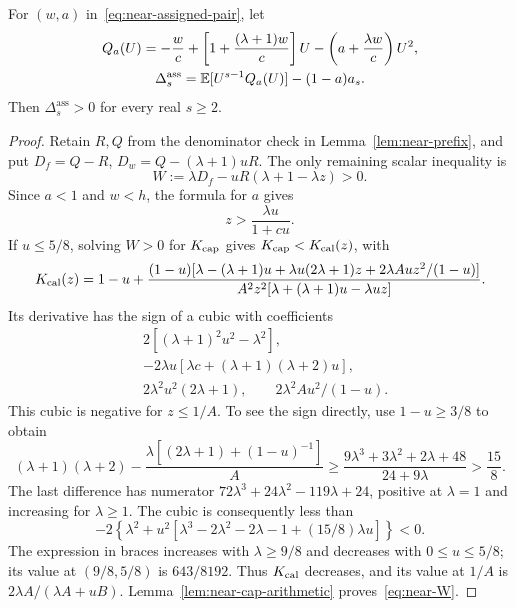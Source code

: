 \begin{lemma}\label{lem:near-condition-f}
For $(w,a)$ in~\eqref{eq:near-assigned-pair}, let
\[\begin{gathered}
 Q_a(U)=-\frac wc+\left[1+\frac{(\lambda+1)w}{c}\right]U
                  -\left(a+\frac{\lambda w}{c}\right)U^2,\\
 \Delta_s^{\mathrm{ass}}=\mathbb E[U^{s-1}Q_a(U)]-(1-a)a_s.
\end{gathered}\]
Then $\Delta_s^{\mathrm{ass}}>0$ for every real $s\ge2$.
\end{lemma}
\begin{proof}
Retain $R,Q$ from the denominator check in Lemma~\ref{lem:near-prefix}, and put $D_f=Q-R$, $D_w=Q-(\lambda+1)uR$. The only remaining scalar inequality is
\begin{equation}\label{eq:near-W}
 W:=\lambda D_f-uR(\lambda+1-\lambda z)>0.
\end{equation}
Since $a<1$ and $w<h$, the formula for $a$ gives
\[
 z>\frac{\lambda u}{1+cu}.
\]
If $u\le5/8$, solving $W>0$ for $K_{\rm cap}$ gives $K_{\rm cap}<K_{\rm cal}(z)$, with
\[
 K_{\rm cal}(z)=1-u+
 \frac{(1-u)[\lambda-(\lambda+1)u+\lambda u(2\lambda+1)z+
                       2\lambda Au z^2/(1-u)]}
      {A^2z^2[\lambda+(\lambda+1)u-\lambda uz]}.
\]
Its derivative has the sign of a cubic with coefficients
\[
\begin{split}
 &2[(\lambda+1)^2u^2-\lambda^2],\\
 &-2\lambda u[\lambda c+(\lambda+1)(\lambda+2)u],\\
 &2\lambda^2u^2(2\lambda+1),\qquad 2\lambda^2Au^2/(1-u).
\end{split}
\]
This cubic is negative for $z\le1/A$. To see the sign directly, use $1-u\ge3/8$ to obtain
\[
 (\lambda+1)(\lambda+2)-
 \frac{\lambda[(2\lambda+1)+(1-u)^{-1}]}A
 \ge\frac{9\lambda^3+3\lambda^2+2\lambda+48}{24+9\lambda}>\frac{15}{8}.
\]
The last difference has numerator $72\lambda^3+24\lambda^2-119\lambda+24$, positive at $\lambda=1$ and increasing for $\lambda\ge1$. The cubic is consequently less than
\[
 -2\left\{\lambda^2+u^2[\lambda^3-2\lambda^2-2\lambda-1+(15/8)\lambda u]\right\}<0.
\]
The expression in braces increases with $\lambda\ge9/8$ and decreases with $0\le u\le5/8$; its value at $(9/8,5/8)$ is $643/8192$. Thus $K_{\rm cal}$ decreases, and its value at $1/A$ is $2\lambda A/(\lambda A+uB)$. Lemma~\ref{lem:near-cap-arithmetic} proves~\eqref{eq:near-W}.


\end{proof}
